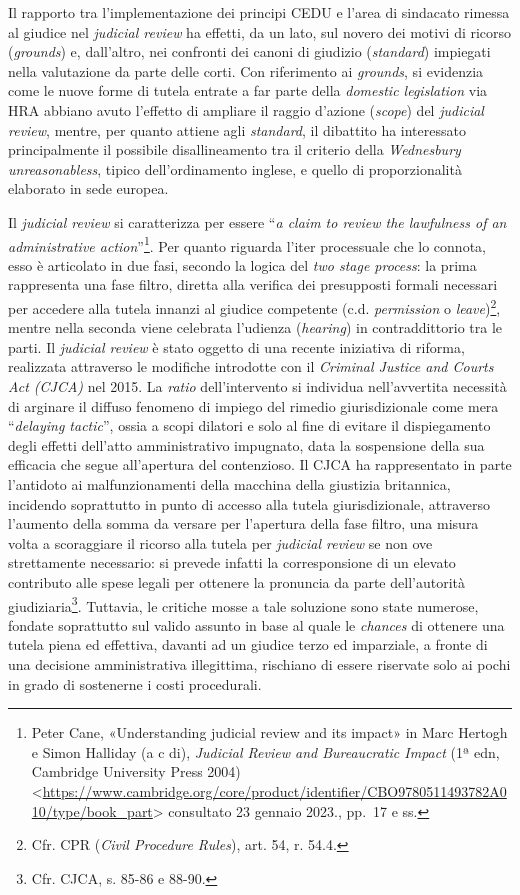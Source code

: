 \documentclass[12pt,it,a4paper,]{report}
\begin{document}
Il rapporto tra l'implementazione dei principi CEDU e l'area di
sindacato rimessa al giudice nel \emph{judicial review} ha effetti, da
un lato, sul novero dei motivi di ricorso (\emph{grounds}) e,
dall'altro, nei confronti dei canoni di giudizio (\emph{standard})
impiegati nella valutazione da parte delle corti. Con riferimento ai
\emph{grounds}, si evidenzia come le nuove forme di tutela entrate a far
parte della \emph{domestic legislation} via HRA abbiano avuto l'effetto
di ampliare il raggio d'azione (\emph{scope}) del \emph{judicial
review}, mentre, per quanto attiene agli \emph{standard}, il dibattito
ha interessato principalmente il possibile disallineamento tra il
criterio della \emph{Wednesbury unreasonabless}, tipico dell'ordinamento
inglese, e quello di proporzionalità elaborato in sede europea.

Il \emph{judicial review} si caratterizza per essere ``\emph{a claim to
review the lawfulness of an administrative action}''\footnote{{Peter
  Cane, {«Understanding judicial review and its impact»} in Marc Hertogh
  e Simon Halliday (a c di), \emph{Judicial Review and Bureaucratic
  Impact} (1ª edn, Cambridge University Press 2004)
  \textless{}\url{https://www.cambridge.org/core/product/identifier/CBO9780511493782A010/type/book_part}\textgreater{}
  consultato 23 gennaio 2023.}, pp.~17 e ss.}. Per quanto riguarda
l'iter processuale che lo connota, esso è articolato in due fasi,
secondo la logica del \emph{two stage process}: la prima rappresenta una
fase filtro, diretta alla verifica dei presupposti formali necessari per
accedere alla tutela innanzi al giudice competente (c.d.
\emph{permission} o \emph{leave})\footnote{Cfr. CPR (\emph{Civil
  Procedure Rules}), art. 54, r. 54.4.}, mentre nella seconda viene
celebrata l'udienza (\emph{hearing}) in contraddittorio tra le parti. Il
\emph{judicial review} è stato oggetto di una recente iniziativa di
riforma, realizzata attraverso le modifiche introdotte con il
\emph{Criminal Justice and Courts Act (CJCA)} nel 2015. La \emph{ratio}
dell'intervento si individua nell'avvertita necessità di arginare il
diffuso fenomeno di impiego del rimedio giurisdizionale come mera
``\emph{delaying tactic}'', ossia a scopi dilatori e solo al fine di
evitare il dispiegamento degli effetti dell'atto amministrativo
impugnato, data la sospensione della sua efficacia che segue
all'apertura del contenzioso. Il CJCA ha rappresentato in parte
l'antidoto ai malfunzionamenti della macchina della giustizia
britannica, incidendo soprattutto in punto di accesso alla tutela
giurisdizionale, attraverso l'aumento della somma da versare per
l'apertura della fase filtro, una misura volta a scoraggiare il ricorso
alla tutela per \emph{judicial review} se non ove strettamente
necessario: si prevede infatti la corresponsione di un elevato
contributo alle spese legali per ottenere la pronuncia da parte
dell'autorità giudiziaria\footnote{Cfr. CJCA, s. 85-86 e 88-90.}.
Tuttavia, le critiche mosse a tale soluzione sono state numerose,
fondate soprattutto sul valido assunto in base al quale le
\emph{chances} di ottenere una tutela piena ed effettiva, davanti ad un
giudice terzo ed imparziale, a fronte di una decisione amministrativa
illegittima, rischiano di essere riservate solo ai pochi in grado di
sostenerne i costi procedurali.
\end{document}
